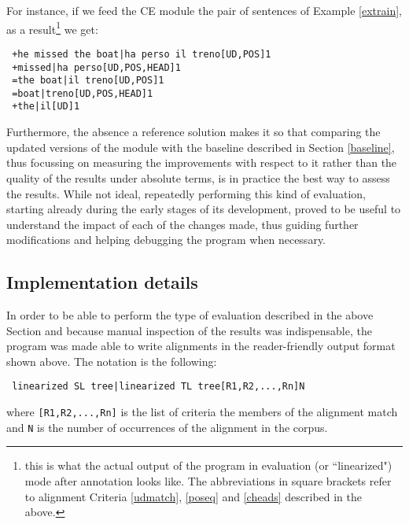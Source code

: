 For instance, if we feed the CE module the pair of sentences of Example \ref{extrain}, as a result\footnote{this is what the actual output of the program in evaluation (or ``linearized") mode after annotation looks like. The abbreviations in square brackets refer to alignment Criteria \ref*{udmatch}, \ref{poseq} and \ref{cheads} described in the above.} we get: \smallskip \label{cann}
\begin{verbatim} 
 +he missed the boat|ha perso il treno[UD,POS]1
 +missed|ha perso[UD,POS,HEAD]1
 =the boat|il treno[UD,POS]1
 =boat|treno[UD,POS,HEAD]1
 +the|il[UD]1
\end{verbatim} 
\smallskip

Furthermore, the absence a reference solution makes it so that comparing the updated versions of the module with the baseline described in Section \ref{baseline}, thus focussing on measuring the improvements with respect to it rather than the quality of the results under absolute terms, is in practice the best way to assess the results.
While not ideal, repeatedly performing this kind of evaluation, starting already during the early stages of its development, proved to be useful to understand the impact of each of the changes made, thus guiding further modifications and helping debugging the program when necessary. \smallskip

\subsection{Implementation details} \label{evalign}
In order to be able to perform the type of evaluation described in the above Section and because manual inspection of the results was indispensable, the program was made able to write alignments in the reader-friendly output format shown above. The notation is the following: \smallskip

\begin{verbatim}
 linearized SL tree|linearized TL tree[R1,R2,...,Rn]N
\end{verbatim} \smallskip

where \texttt{[R1,R2,...,Rn]} is the list of criteria the members of the alignment match and \texttt{N} is the number of occurrences of the alignment in the corpus. \smallskip

